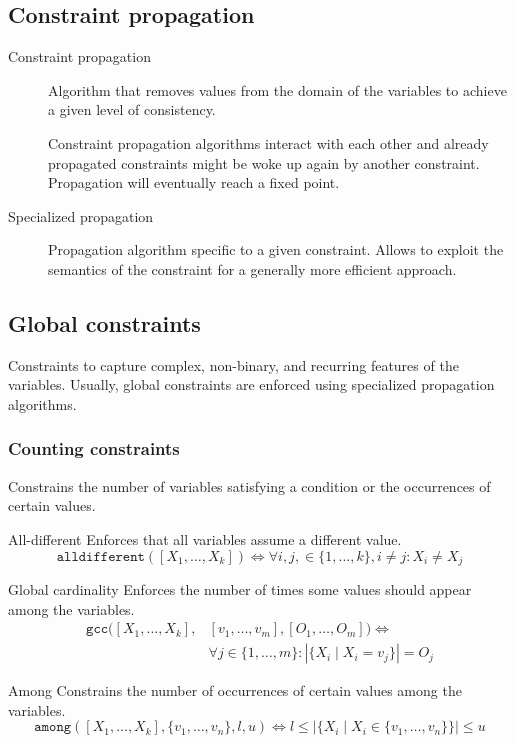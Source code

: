 \subsection{Constraint propagation}

\begin{description}
    \item[Constraint propagation] 
        Algorithm that removes values from the domain of the variables to achieve a given level of consistency.

        Constraint propagation algorithms interact with each other and already propagated constraints might be woke up again by another constraint.
        Propagation will eventually reach a fixed point.


    \item[Specialized propagation] 
        Propagation algorithm specific to a given constraint.
        Allows to exploit the semantics of the constraint for a generally more efficient approach.
\end{description}


\subsection{Global constraints}

Constraints to capture complex, non-binary, and recurring features of the variables.
Usually, global constraints are enforced using specialized propagation algorithms.


\subsubsection{Counting constraints}
Constrains the number of variables satisfying a condition
or the occurrences of certain values.

\begin{descriptionlist}
    \item[All-different] 
        Enforces that all variables assume a different value.
        \[ \texttt{alldifferent}([X_1, \dots, X_k]) \iff \forall i, j, \in \{ 1, \dots, k\}, i \neq j: X_i \neq X_j \]

    \item[Global cardinality]
        Enforces the number of times some values should appear among the variables.
        \[ 
            \begin{split}
                \texttt{gcc}([X_1, \dots, X_k], &[v_1, \dots, v_m], [O_1, \dots, O_m]) \iff \\
                & \forall j \in \{1, \dots, m\}: \left\vert \{ X_i \mid X_i = v_j \} \right\vert = O_j
            \end{split}
        \]

    \item[Among]
        Constrains the number of occurrences of certain values among the variables.
        \[
            \texttt{among}([X_1, \dots, X_k], \{v_1, \dots, v_n\}, l, u) \iff l \leq \left\vert \{ X_i \mid X_i \in \{v_1, \dots, v_n\} \} \right\vert \leq u
        \]
\end{descriptionlist}


